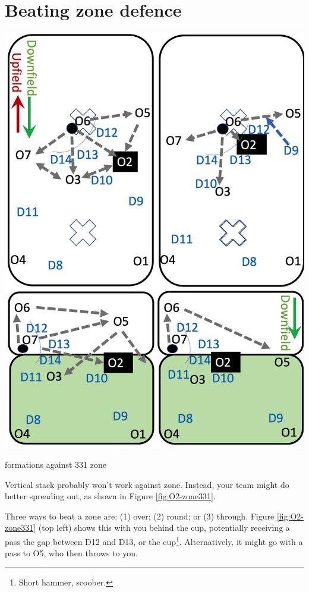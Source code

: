 \documentclass{tufte-handout}
\begin{document}
\section{Beating zone defence}\label{sec:zone}
\begin{marginfigure}%
  \includegraphics[width=\linewidth]{O2-zone331}
  \caption{formations against 331 zone}
  \label{fig:O2-zone331}
\end{marginfigure}
Vertical stack 
probably won't work
against zone. 
Instead, your 
team might do better spreading out, 
as shown 
in Figure \ref{fig:O2-zone331}. 

Three ways to beat a zone are:
(1) over;
(2) round; or
(3) through. 
Figure \ref{fig:O2-zone331}
(top left)
shows this 
with you 
behind the cup, 
potentially receiving a pass 
the gap between 
D12 
and D13, or 
the cup\footnote{
Short hammer, scoober.}.
Alternatively, 
it might go  
with a pass to 
O5, 
who then 
throws to you.
\end{document}
